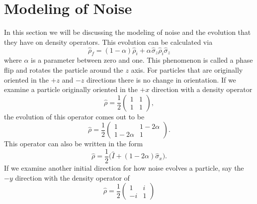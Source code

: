 \documentclass[twocolumn]{article}
\begin{document}
\section*{Modeling of Noise}
In this section we will be discussing the modeling of noise and the evolution that they have on density operators. This evolution can be calculated via
\begin{equation}
\hat{\rho}_f=(1-\alpha)\hat{\rho}_i+\alpha\hspace{1pt}\hat{\sigma}_z\hat{\rho}_i\hat{\sigma}_z
\end{equation}
where $\alpha$ is a parameter between zero and one. This phenomenon is called a phase flip and rotates the particle around the $z$ axis. For particles that are originally oriented in the $+z$ and $-z$ directions there is no change in orientation. If we examine a particle originally oriented in the $+x$ direction with a density operator 
\begin{equation}
\hat{\rho}=\frac{1}{2}
\begin{pmatrix}
1 & 1 \\
1 & 1
\end{pmatrix},
\end{equation}
the evolution of this operator comes out to be
\begin{equation}
\hat{\rho}=\frac{1}{2}
\begin{pmatrix}
1 & 1-2\alpha \\
1-2\alpha & 1
\end{pmatrix}.
\end{equation}
This operator can also be written in the form
\begin{equation}
\hat{\rho}=\frac{1}{2}\big(\hat{I}+(1-2\alpha)\hat{\sigma}_x\big).
\end{equation}
If we examine another initial direction for how noise evolves a particle, say the $-y$ direction with the density operator of 
\begin{equation}
\hat{\rho}=\frac{1}{2}
\begin{pmatrix}
1 & i \\
-i & 1
\end{pmatrix}
\end{equation}
\end{document}

